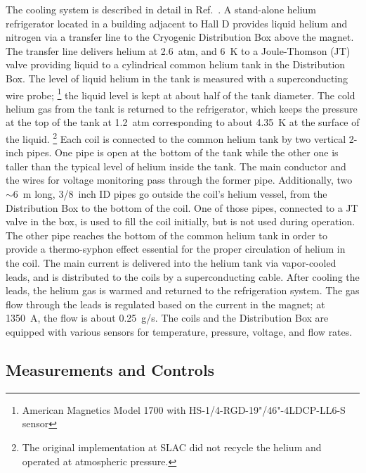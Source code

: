 The cooling system is described in detail in Ref.~\cite{Lavendure:2014:refrig}.
A stand-alone helium refrigerator located
in a building adjacent to Hall D provides liquid helium and nitrogen
via a transfer line to the Cryogenic Distribution Box above the
magnet. The transfer line delivers helium at 2.6~atm, and 6~K to a Joule-Thomson
(JT) valve providing liquid to a cylindrical common helium tank in the
Distribution Box. The level of liquid helium in the tank is measured
with a superconducting wire probe;%
\footnote{
  American Magnetics Model 1700 with HS-1/4-RGD-19"/46"-4LDCP-LL6-S sensor
}
 the liquid level is kept at about half of the tank diameter. The cold helium gas
 from the tank is returned to the refrigerator, which keeps the
 pressure at the top of the tank at 1.2~atm corresponding to about
 4.35~K at the surface of the liquid.%
\footnote{
  The original implementation at SLAC did not recycle the helium and
  operated at atmospheric pressure.
}
Each coil is connected to the common helium tank by two vertical 2-inch
pipes.  One pipe is open at the bottom of the tank while the other one
is taller than the typical level of helium inside the tank. The main
conductor and the wires for voltage monitoring pass through the former
pipe. Additionally, two $\sim$6~m long, 3/8~inch ID pipes go outside
the coil's helium vessel, from the Distribution Box to the bottom of
the coil. One of those pipes, connected to a JT valve in the box, is used to fill the coil initially, but is not used during operation.
The other pipe reaches the bottom of
the common helium tank in order to provide 
a thermo-syphon effect essential
for the proper circulation of helium in the coil. The main current is
delivered into the helium tank via vapor-cooled leads, and is
distributed to the coils by a superconducting cable. After cooling the
leads, the helium gas is warmed and returned to the refrigeration
system. The gas flow through the leads is regulated based on the
current in the magnet; at 1350~A, the flow is about 0.25~g/s. The
coils and the Distribution Box are equipped with various sensors for
temperature, pressure, voltage, and flow rates.

\subsection[Measurements and Controls]{
         Measurements and Controls
        \label{sec:sol:controls}
}

